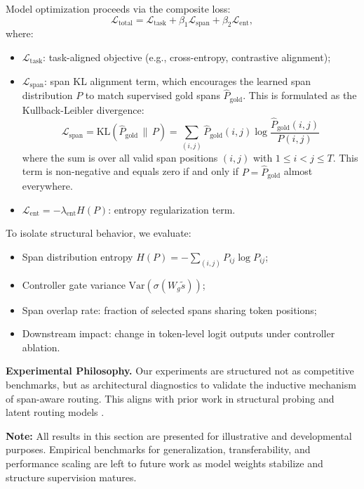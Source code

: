Model optimization proceeds via the composite loss:
\begin{equation}
\mathcal{L}_{\text{total}} = \mathcal{L}_{\text{task}} + \beta_1 \mathcal{L}_{\text{span}} + \beta_2 \mathcal{L}_{\text{ent}},
\label{eq:exp_loss_summary}
\end{equation}
where:
\begin{itemize}[leftmargin=1.8em]
    \item \(\mathcal{L}_{\text{task}}\): task-aligned objective (e.g., cross-entropy, contrastive alignment);
    \item \(\mathcal{L}_{\text{span}}\): span KL alignment term, which encourages the learned span distribution \(P\) to match supervised gold spans \(\hat{P}_{\text{gold}}\). This is formulated as the Kullback-Leibler divergence:
    \begin{equation}
    \mathcal{L}_{\text{span}} = \mathrm{KL}(\hat{P}_{\text{gold}} \,\|\, P) = \sum_{(i,j)} \hat{P}_{\text{gold}}(i,j) \log \frac{\hat{P}_{\text{gold}}(i,j)}{P(i,j)}
    \label{eq:kl_span}
    \end{equation}
    where the sum is over all valid span positions \((i,j)\) with \(1 \le i < j \le T\). This term is non-negative and equals zero if and only if \(P = \hat{P}_{\text{gold}}\) almost everywhere.
    \item \(\mathcal{L}_{\text{ent}} = - \lambda_{\text{ent}} H(P)\): entropy regularization term.
\end{itemize}

To isolate structural behavior, we evaluate:
\begin{itemize}
  \item Span distribution entropy \(H(P) = -\sum_{(i,j)} P_{ij} \log P_{ij}\);
  \item Controller gate variance \(\mathrm{Var}(\sigma(W_g \tilde{s}))\);
  \item Span overlap rate: fraction of selected spans sharing token positions;
  \item Downstream impact: change in token-level logit outputs under controller ablation.
\end{itemize}

\vspace{0.5em}
\noindent\textbf{Experimental Philosophy.}
Our experiments are structured not as competitive benchmarks, but as architectural diagnostics to validate the inductive mechanism of span-aware routing. This aligns with prior work in structural probing and latent routing models \cite{gupta2022molt, tay2020sparse, clark2018semi}.

\vspace{0.75em}
\textbf{Note:} All results in this section are presented for illustrative and developmental purposes. Empirical benchmarks for generalization, transferability, and performance scaling are left to future work as model weights stabilize and structure supervision matures.







